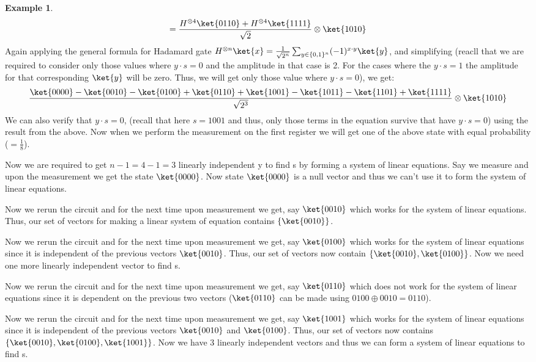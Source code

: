 \documentclass[12pt, oneside]{book}
\theoremstyle{definition}
\theoremstyle{definition}
\newtheorem{example}{Example}[section]
\theoremstyle{remark}
\begin{document}
\begin{example}
    \[
    =\frac{H^{\otimes 4}\ket{0110}+H^{\otimes 4}\ket{1111}}{\sqrt{2}} \otimes \ket{1010}
    \]
    Again applying the general formula for Hadamard gate $H^{\otimes n}\ket{x}=\frac{1}{\sqrt{2^n}}\sum_{y \in \{0,1\}^n}(-1)^{x\cdot y}\ket{y}$, and simplifying (reacll that we are required to consider only those values where $y\cdot s=0$ and the amplitude in that case is 2. For the cases where the $y \cdot s=1$ the amplitude for that corresponding $\ket{y}$ will be zero. Thus,
    we will get only those value where $y\cdot s=0$), we get:
    \[
    \frac{\ket{0000}-\ket{0010}-\ket{0100}+\ket{0110}+\ket{1001}-\ket{1011}-\ket{1101}+\ket{1111}}{\sqrt{2^3}}\otimes \ket{1010}
    \]
    We can also verify that $y \cdot s=0$, (recall that here $s=1001$ and thus, only those terms in the equation survive that have $y\cdot s=0$) using the result from the above. 
    Now when we perform the measurement on the first register we will get one of the above state with equal probability ($=\frac{1}{8}$). 

    Now we are required to get $n-1=4-1=3$ linearly independent y to find s by forming a system of linear equations.
    Say we measure and upon the measurement we get the state $\ket{0000}$. Now state $\ket{0000}$ is a null vector and thus we can't use it to form the system of linear equations.
    
    Now we rerun the circuit and for the next time upon measurement we get, say $\ket{0010}$ which works for the system of linear equations. Thus, our set of vectors for making a linear system 
    of equation contains $\{\ket{0010}\}$.
    
    Now we rerun the circuit and for the next time upon measurement we get, say $\ket{0100}$ which works for the system of linear equations since it is independent of the previous vectors $\ket{0010}$.
    Thus, our set of vectors now contain $\{\ket{0010},\ket{0100}\}$. Now we need one more linearly independent vector to find s.

    Now we rerun the circuit and for the next time upon measurement we get, say $\ket{0110}$ which does not work for the system of linear equations since it is dependent on the previous two vectors ($\ket{0110}$ can be made using $0100 \oplus 0010 = 0110$).

    Now we rerun the circuit and for the next time upon measurement we get, say $\ket{1001}$ which works for the system of linear equations since it is independent of the previous vectors $\ket{0010}$ and $\ket{0100}$.
    Thus, our set of vectors now contains $\{\ket{0010},\ket{0100},\ket{1001}\}$. Now we have 3 linearly independent vectors and thus we can form a system of linear equations to find s.


\end{example}
\end{document}
